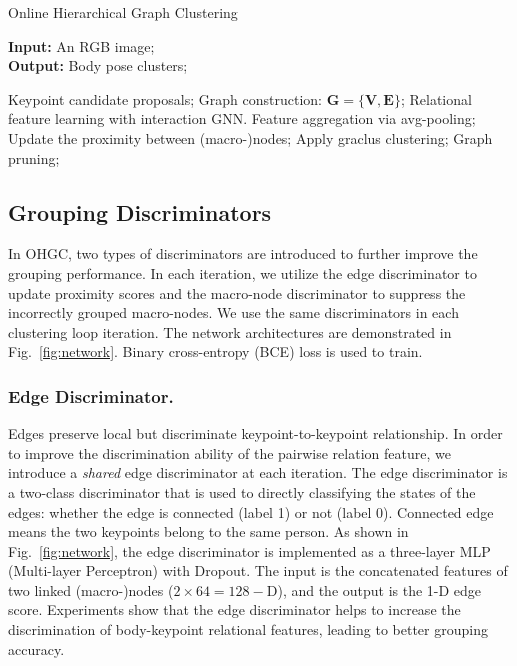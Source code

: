 \documentclass[runningheads]{llncs}
\begin{document}
	\begin{algorithm}
		\caption{Online Hierarchical Graph Clustering}
		\hspace*{0.02in} {\bf Input:}
		An RGB image; \\
		\hspace*{0.02in} {\bf Output:} 
		Body pose clusters;
		\begin{algorithmic}
			\State Keypoint candidate proposals;
			\State Graph construction: $\mathbf{G} = \{\mathbf{V}, \mathbf{E}\}$;
			\State Relational feature learning with interaction GNN.
			\Repeat 
			\State Feature aggregation via avg-pooling;
			\State Update the proximity between (macro-)nodes;
			\State Apply graclus clustering; 
			\State Graph pruning;
		\end{algorithmic}
		\label{alg:OHGC}
	\end{algorithm}
	
	\subsection{Grouping Discriminators}
	\label{sec:discriminators}
	In OHGC, two types of discriminators are introduced to further improve the grouping performance. In each iteration, we utilize the edge discriminator to update proximity scores and the macro-node discriminator to suppress the incorrectly grouped macro-nodes. We use the same discriminators in each clustering loop iteration. The network architectures are demonstrated in Fig.~\ref{fig:network}. Binary cross-entropy (BCE) loss is used to train.
	
	\subsubsection{Edge Discriminator.} 
	Edges preserve local but discriminate keypoint-to-keypoint relationship. In order to improve the discrimination ability of the pairwise relation feature, we introduce a \emph{shared} edge discriminator at each iteration. The edge discriminator is a two-class discriminator that is used to directly classifying the states of the edges: whether the edge is connected (label 1) or not (label 0). Connected edge means the two keypoints belong to the same person. As shown in Fig.~\ref{fig:network}, the edge discriminator is implemented as a three-layer MLP (Multi-layer Perceptron) with Dropout. The input is the concatenated features of two linked (macro-)nodes ($2\times64=128-$D), and the output is the 1-D edge score. Experiments show that the edge discriminator helps to increase the discrimination of body-keypoint relational features, leading to better grouping accuracy. 
	
\end{document}
